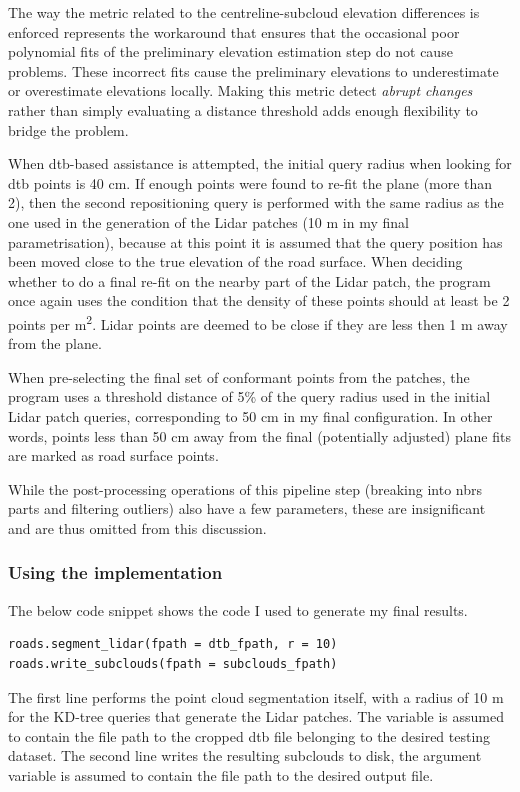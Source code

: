 The way the metric related to the centreline-subcloud elevation differences is enforced represents the workaround that ensures that the occasional poor polynomial fits of the preliminary elevation estimation step do not cause problems. These incorrect fits cause the preliminary elevations to underestimate or overestimate elevations locally. Making this metric detect \textit{abrupt changes} rather than simply evaluating a distance threshold adds enough flexibility to bridge the problem.

When \ac{dtb}-based assistance is attempted, the initial query radius when looking for \ac{dtb} points is 40 cm. If enough points were found to re-fit the plane (more than 2), then the second repositioning query is performed with the same radius as the one used in the generation of the Lidar patches (10 m in my final parametrisation), because at this point it is assumed that the query position has been moved close to the true elevation of the road surface. When deciding whether to do a final re-fit on the nearby part of the Lidar patch, the program once again uses the condition that the density of these points should at least be 2 points per m\textsuperscript{2}. Lidar points are deemed to be close if they are less then 1 m away from the plane.

When pre-selecting the final set of conformant points from the patches, the program uses a threshold distance of 5\% of the query radius used in the initial Lidar patch queries, corresponding to 50 cm in my final configuration. In other words, points less than 50 cm away from the final (potentially adjusted) plane fits are marked as road surface points.

While the post-processing operations of this pipeline step (breaking into \ac{nbrs} parts and filtering outliers) also have a few parameters, these are insignificant and are thus omitted from this discussion.

\subsubsection{Using the implementation}

The below code snippet shows the code I used to generate my final results.

\begin{verbatim}
roads.segment_lidar(fpath = dtb_fpath, r = 10)
roads.write_subclouds(fpath = subclouds_fpath)
\end{verbatim}

The first line performs the point cloud segmentation itself, with a radius of 10 m for the KD-tree queries that generate the Lidar patches. The variable  is assumed to contain the file path to the cropped \ac{dtb} file belonging to the desired testing dataset. The second line writes the resulting subclouds to disk, the argument variable is assumed to contain the file path to the desired output file.

